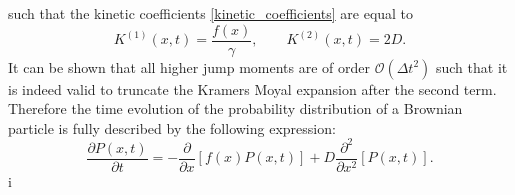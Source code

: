 such that the kinetic coefficients \eqref{kinetic_coefficients} are equal to
\begin{equation}
    K^{(1)}(x,t) = \frac{f(x)}{\gamma}, \qquad K^{(2)}(x,t) = 2 D.
    \label{BD_kinetic_coefficients}
\end{equation}
It can be shown that all higher jump moments are of order $\mathcal{O}(\Delta t ^{2})$ such that it is indeed valid to truncate the Kramers Moyal expansion after the second term. Therefore the time evolution of the probability distribution of a Brownian particle is fully described by the following expression:
\begin{equation}
    \frac{\partial P(x,t)}{\partial t} = - \frac{\partial}{\partial x} \left[f(x)P(x,t) \right] + D\frac{\partial^2}{\partial x^2}\left[P(x,t) \right] .
    \label{FPE2}
\end{equation}i

